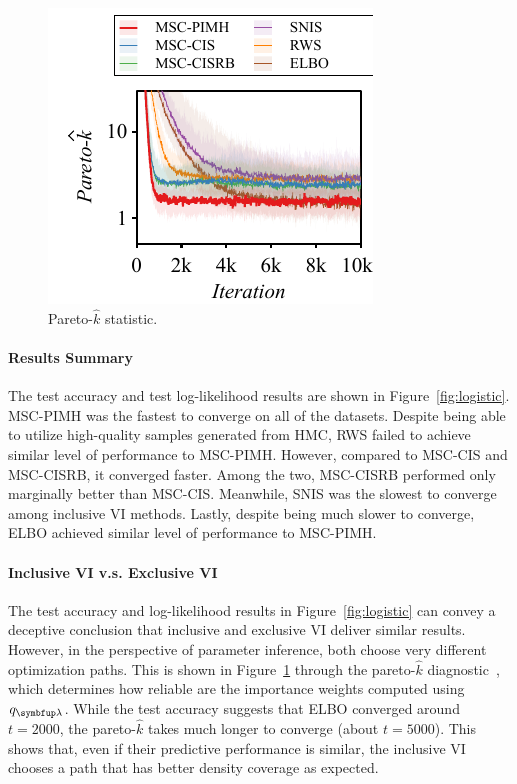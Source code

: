 %
\begin{figure}
  \vspace{-0.3in}
  \includegraphics[scale=0.8]{figures/german_01.pdf}
  \caption{Pareto-\(\widehat{k}\) statistic.}\label{fig:paretok}
  \vspace{-0.1in}
\end{figure}
%
\paragraph{Results Summary}
The test accuracy and test log-likelihood results are shown in Figure~\ref{fig:logistic}.
MSC-PIMH was the fastest to converge on all of the datasets.
Despite being able to utilize high-quality samples generated from HMC, RWS failed to achieve similar level of performance to MSC-PIMH.
However, compared to MSC-CIS and MSC-CISRB, it converged faster.
Among the two, MSC-CISRB performed only marginally better than MSC-CIS.
Meanwhile, SNIS was the slowest to converge among inclusive VI methods.
Lastly, despite being much slower to converge, ELBO achieved similar level of performance to MSC-PIMH.

\paragraph{Inclusive VI v.s. Exclusive VI}
The test accuracy and log-likelihood results in Figure~\ref{fig:logistic} can convey a deceptive conclusion that inclusive and exclusive VI deliver similar results.
However, in the perspective of parameter inference, both choose very different optimization paths.
This is shown in Figure~\ref{fig:paretok} through the pareto-\(\widehat{k}\) diagnostic~\citep{vehtari_pareto_2021, NEURIPS2020_7cac11e2}, which determines how reliable are the importance weights computed using \(q_{\vlambda}\).
While the test accuracy suggests that ELBO converged around \(t=2000\), the pareto-\(\widehat{k}\) takes much longer to converge (about \(t=5000\)).
This shows that, even if their predictive performance is similar, the inclusive VI chooses a path that has better density coverage as expected.

